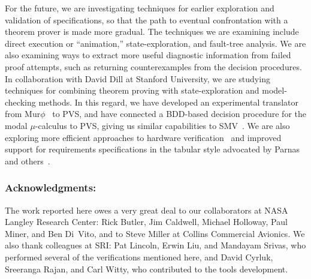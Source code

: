 For the future, we are investigating techniques for earlier
exploration and validation of specifications, so that the path to
eventual confrontation with a theorem prover is made more gradual.
The techniques we are examining include direct execution or
``animation,'' state-exploration, and fault-tree analysis.  We are
also examining ways to extract more useful diagnostic information from
failed proof attempts, such as returning counterexamples from the
decision procedures.  In collaboration with David Dill at Stanford
University, we are studying techniques for combining theorem proving
with state-exploration and model-checking methods.  In this regard, we
have developed an experimental translator from Mur$\phi$~\cite{Murphi}
to PVS, and have connected a BDD-based decision procedure for the
modal $\mu$-calculus to PVS, giving us similar capabilities to
SMV~\cite{McMillan:SMV}.  We are also exploring more efficient
approaches to hardware verification~\cite{Burch&Dill94,Cyrluk94:gtl}
and improved support for requirements specifications in the tabular
style advocated by Parnas and
others~\cite{Heninger:A7paper,Rushby&Srivas:HOL93}.

\subsubsection*{Acknowledgments:} 
The work reported here owes a very great deal to our collaborators at
NASA Langley Research Center: Rick Butler, Jim Caldwell, Michael
Holloway, Paul Miner, and Ben Di~Vito, and to Steve Miller at Collins
Commercial Avionics.  We also thank colleagues at SRI: Pat Lincoln,
Erwin Liu, and Mandayam Srivas, who performed several of the
verifications mentioned here, and David Cyrluk, Sreeranga Rajan, and
Carl Witty, who contributed to the tools development.



\newpage
\pagestyle{empty}\mbox{ }
\newpage
\pagestyle{empty}\mbox{ }
\newpage



